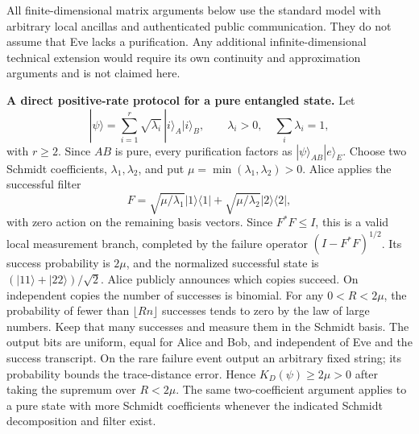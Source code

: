 \documentclass[11pt]{article}
\begin{document}
All finite-dimensional matrix arguments below use the standard model with
arbitrary local ancillas and authenticated public communication.  They do not
assume that Eve lacks a purification.  Any additional infinite-dimensional
technical extension would require its own continuity and approximation
arguments and is not claimed here.

\textbf{A direct positive-rate protocol for a pure entangled state.}
Let
\[
 |\psi\rangle=\sum_{i=1}^r\sqrt{\lambda_i}\,|i\rangle_A|i\rangle_B,
 \qquad \lambda_i>0,\quad\sum_i\lambda_i=1,
\]
with $r\geq2$.  Since $AB$ is pure, every purification factors as
$|\psi\rangle_{AB}|e\rangle_E$.  Choose two Schmidt coefficients,
$\lambda_1,\lambda_2$, and put $\mu=\min(\lambda_1,\lambda_2)>0$.
Alice applies the successful filter
\[
 F=\sqrt{\mu/\lambda_1}|1\rangle\langle1|
   +\sqrt{\mu/\lambda_2}|2\rangle\langle2|,
\]
with zero action on the remaining basis vectors.  Since $F^*F\leq I$, this
is a valid local measurement branch, completed by the failure operator
$(I-F^*F)^{1/2}$.  Its success probability is $2\mu$, and the normalized
successful state is $(|11\rangle+|22\rangle)/\sqrt2$.
Alice publicly announces which copies succeed.  On independent copies the
number of successes is binomial.  For any $0<R<2\mu$, the probability of
fewer than $\lfloor Rn\rfloor$ successes tends to zero by the law of large
numbers.  Keep that many successes and measure them in the Schmidt basis.
The output bits are uniform, equal for Alice and Bob, and independent of Eve
and the success transcript.  On the rare failure event output an arbitrary
fixed string; its probability bounds the trace-distance error.  Hence
$K_D(\psi)\geq2\mu>0$ after taking the supremum over $R<2\mu$.
The same two-coefficient argument applies to a pure state with more Schmidt
coefficients whenever the indicated Schmidt decomposition and filter exist.
\end{document}
